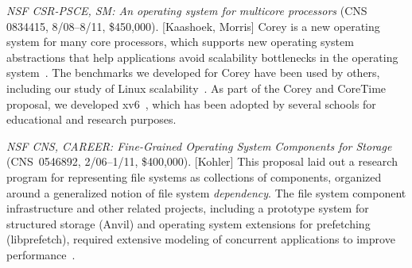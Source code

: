 \textit{NSF CSR-PSCE, SM: An operating system for multicore processors} (CNS
0834415, 8/08--8/11, \$450,000).
[Kaashoek, Morris]
Corey is a new operating system for many core
processors, which supports new operating system abstractions that help
applications avoid scalability bottlenecks in the operating system~\cite{boyd-wickizer:corey}.
The benchmarks we developed for Corey have been used by others, including our
study of Linux scalability~\cite{boyd-wickizer:scaling}.  As part of the Corey and
CoreTime proposal, we developed xv6~\cite{xv6}, which has been adopted by
several schools for educational and research purposes.

\textit{NSF CNS, CAREER: Fine-Grained Operating System Components for
  Storage} (CNS~0546892, 2/06--1/11, \$400,000). [Kohler] This
proposal laid out a research program for representing file systems as
collections of components, organized around a generalized notion of
file system \emph{dependency}. The file system component
infrastructure and other related projects, including a prototype
system for structured storage (Anvil) and operating system extensions
for prefetching (libprefetch), required extensive modeling of
concurrent applications to improve performance~\cite{mammarella09modular,vandebogart09reducing,liogkas08exploring,chun08netcomplex,frost07generalized,delosreyes05kudos}.


